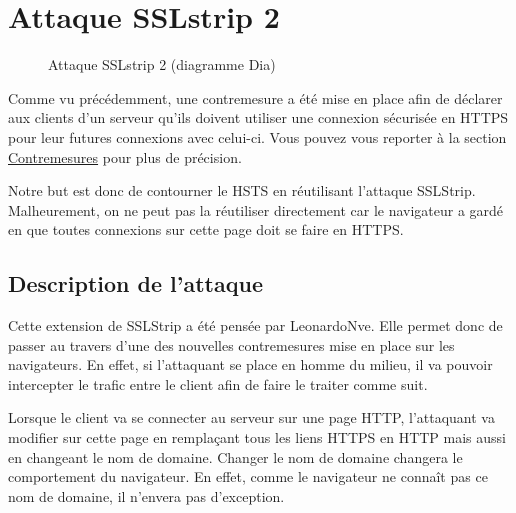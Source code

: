 \chapter{Attaque SSLstrip 2}

\begin{figure}[H]
  \caption{Attaque SSLstrip 2 (diagramme Dia)}
\end{figure}

Comme vu précédemment, une contremesure a été mise en place afin de déclarer aux clients d'un serveur qu'ils doivent utiliser une connexion sécurisée en HTTPS pour leur futures connexions avec celui-ci. Vous pouvez vous reporter à la section \hyperref[sec:hsts]{Contremesures} pour plus de précision.

Notre but est donc de contourner le HSTS en réutilisant l'attaque SSLStrip. Malheurement, on ne peut pas la réutiliser directement car le navigateur a gardé en que toutes connexions sur cette page doit se faire en HTTPS.

\section{Description de l'attaque}
Cette extension de SSLStrip a été pensée par LeonardoNve. Elle permet donc de passer au travers d'une des nouvelles contremesures mise en place sur les navigateurs. En effet, si l'attaquant se place en homme du milieu, il va pouvoir intercepter le trafic entre le client afin de faire le traiter comme suit.

Lorsque le client va se connecter au serveur sur une page HTTP, l'attaquant va modifier sur cette page en remplaçant tous les liens HTTPS en HTTP mais aussi en changeant le nom de domaine. Changer le nom de domaine changera le comportement du navigateur. En effet, comme le navigateur ne connaît pas ce nom de domaine, il n'envera pas d'exception.

